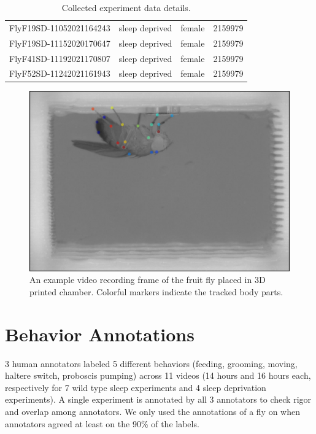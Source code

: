 \begin{table}[htb!]
\begin{adjustbox}{width=1\textwidth}
\begin{tabular}{c c c c}
			FlyF19SD-11052021164243                      & sleep deprived                               & female                                  & 2159979                                   \\
			FlyF19SD-11152020170647                      & sleep deprived                               & female                                  & 2159979                                   \\
			FlyF41SD-11192021170807                      & sleep deprived                               & female                                  & 2159979                                   \\
			FlyF52SD-11242021161943                      & sleep deprived                               & female                                  & 2159979                                   \\
			\bottomrule
		\end{tabular}
	\end{adjustbox}
	\caption{Collected experiment data details. \label{table:experiment-details}}
\end{table}

\begin{figure}[ht!]
	\centering
	\includegraphics[width=0.75\linewidth]{figures/FlyTrackedBodyParts.png}
	\caption[An example frame of the fruit fly placed in 3D printed chamber.] {An example video recording frame of the fruit fly placed in 3D printed chamber. Colorful markers indicate the tracked body parts.}
\end{figure}

\section{Behavior Annotations}

3 human annotators labeled 5 different behaviors (feeding, grooming, moving, haltere switch, proboscis pumping) across 11 videos (14 hours and 16 hours each, respectively for 7 wild type sleep experiments and 4 sleep deprivation experiments).
A single experiment is annotated by all 3 annotators to check rigor and overlap among annotators. We only used the annotations of a fly on when  annotators agreed at least on the 90\% of the labels.


